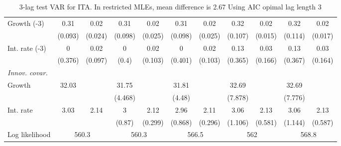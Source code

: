 \begin{table}[htbp]
\begin{tabular}{@{\extracolsep{4pt}}lcccccccccc@{}}
\quad Growth (-3) 	 &0.31 	 & 0.02 	 & 0.31 	 & 0.02 	 & 0.31 	 & 0.02 	 & 0.32 	 & 0.02 	 & 0.32 	 & 0.02	 \\ 
 		 & (0.093) 	 & (0.024) 	 & (0.098) 	 & (0.025) 	 & (0.098) 	 & (0.025) 	 & (0.107) 	 & (0.015) 	 & (0.114) 	 & (0.017) 	 \\ 
\quad Int. rate (-3) 	 &0 	 & 0.02 	 & 0 	 & 0.02 	 & 0 	 & 0.02 	 & 0.13 	 & 0.03 	 & 0.13 	 & 0.03	 \\ 
 		 & (0.376) 	 & (0.097) 	 & (0.4) 	 & (0.103) 	 & (0.401) 	 & (0.103) 	 & (0.365) 	 & (0.166) 	 & (0.367) 	 & (0.164) 	 \\ 
\rule{0pt}{4ex} \emph{Innov. covar.}  	 & 	 & 	 & 	 & 	 & 	 & 	 & 	 & 	 & 	 &\\ 
\quad Growth 	 &32.03 	 &  	 & 31.75 	 &  	 & 31.81 	 &  	 & 32.69 	 &  	 & 32.69 	 & 	 \\ 
 		 &  	 &  	 & (4.468) 	 &  	 & (4.48) 	 &  	 & (7.878) 	 &  	 & (7.776) 	 &  	 \\ 
\quad Int. rate 	 &3.03 	 & 2.14 	 & 3 	 & 2.12 	 & 2.96 	 & 2.11 	 & 3.06 	 & 2.13 	 & 3.06 	 & 2.13	 \\ 
 		 &  	 &  	 & (0.87) 	 & (0.299) 	 & (0.868) 	 & (0.296) 	 & (1.106) 	 & (0.581) 	 & (1.144) 	 & (0.587) 	 \\ 
 \hline \rule{0pt}{4ex} 
  Log likelihood 	 &\multicolumn{2}{c}{560.3} 	 & \multicolumn{2}{c}{560.3} 	 & \multicolumn{2}{c}{566.5} 	 & \multicolumn{2}{c}{562} 	 & \multicolumn{2}{c}{568.8}\\ 

 \hline 	\end{tabular}		\caption{3-lag test VAR for ITA. In restricted MLEs, mean difference is 2.67 Using AIC opimal lag length 3}
		\label{tab:ITAopt_}

\end{table}